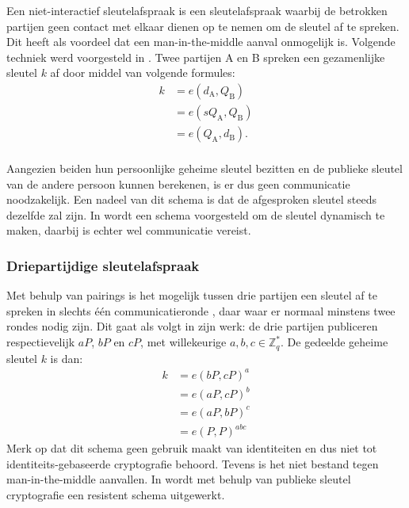 Een niet-interactief sleutelafspraak is een sleutelafspraak waarbij de betrokken partijen geen contact met elkaar dienen op te nemen om de sleutel af te spreken. Dit heeft als voordeel dat een man-in-the-middle aanval onmogelijk is. Volgende techniek werd voorgesteld in \cite{sakai}. Twee partijen A en B spreken een gezamenlijke sleutel $k$ af door middel van volgende formules:
\[\begin{aligned}
k	&= e(d_{\text{A}}, Q_{\text{B}})\\
	&= e(s Q_{\text{A}}, Q_{\text{B}})\\
	&= e(Q_{\text{A}}, d_{\text{B}}).\\
\end{aligned}\]

Aangezien beiden hun persoonlijke geheime sleutel bezitten en de publieke sleutel van de andere persoon kunnen berekenen, is er dus geen communicatie noodzakelijk. Een nadeel van dit schema is dat de afgesproken sleutel steeds dezelfde zal zijn. In \cite{smart} wordt een schema voorgesteld om de sleutel dynamisch te maken, daarbij is echter wel communicatie vereist.

\subsubsection{Driepartijdige sleutelafspraak}

Met behulp van pairings is het mogelijk tussen drie partijen een sleutel af te spreken in slechts \'e\'en communicatieronde \cite{joux}, daar waar er normaal minstens twee rondes nodig zijn. Dit gaat als volgt in zijn werk: de drie partijen publiceren respectievelijk $aP$, $bP$ en $cP$, met willekeurige $a, b, c \in \mathbb{Z}_q^*$. De gedeelde geheime sleutel $k$ is dan:
\[\begin{aligned}
k	&= e(bP, cP)^a\\
	&= e(aP, cP)^b\\
	&= e(aP, bP)^c\\
	&= e(P, P)^{abc}
\end{aligned}\]
Merk op dat dit schema geen gebruik maakt van identiteiten en dus niet tot identiteits-gebaseerde cryptografie behoord. Tevens is het niet bestand tegen man-in-the-middle aanvallen. In \cite{paterson} wordt met behulp van publieke sleutel cryptografie een resistent schema uitgewerkt.
